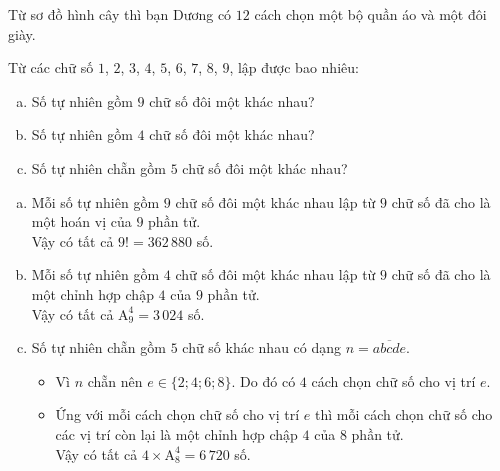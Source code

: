 \begin{bt}
{\begin{center}
		\end{center}
		Từ sơ đồ hình cây thì bạn Dương có $12$ cách chọn một bộ quần áo và một đôi giày.
	}
\end{bt}

\begin{bt}%
	Từ các chữ số $1$, $2$, $3$, $4$, $5$, $6$, $7$, $8$, $9$, lập được bao nhiêu:
	\begin{enumerate}[a)]
		\item Số tự nhiên gồm $9$ chữ số đôi một khác nhau?
		\item Số tự nhiên gồm $4$ chữ số đôi một khác nhau?
		\item Số tự nhiên chẵn gồm $5$ chữ số đôi một khác nhau?
	\end{enumerate}
	\loigiai
	{\begin{enumerate}[a)]
			\item Mỗi số tự nhiên gồm $9$ chữ số đôi một khác nhau lập từ $9$ chữ số đã cho là một hoán vị của $9$ phần tử.\\
			Vậy có tất cả $9!=362\, 880$ số.
			\item Mỗi số tự nhiên gồm $4$ chữ số đôi một khác nhau lập từ $9$ chữ số đã cho là một chỉnh hợp chập $4$ của $9$ phần tử.\\
			Vậy có tất cả $\mathrm{A}_9^4=3\, 024$ số.
			\item Số tự nhiên chẵn gồm $5$ chữ số khác nhau có dạng $n=\overline{abcde}$.
			\begin{itemize}
				\item Vì $n$ chẵn nên $e\in\{2;4;6;8\}$. Do đó có $4$ cách chọn chữ số cho vị trí $e$.
				\item Ứng với mỗi cách chọn chữ số cho vị trí $e$ thì mỗi cách chọn chữ số cho các vị trí còn lại là một chỉnh hợp chập $4$ của $8$ phần tử.\\
				Vậy có tất cả $4\times\mathrm{A}_8^4=6\, 720$ số.
			\end{itemize}
		\end{enumerate}
		
	}
\end{bt}


